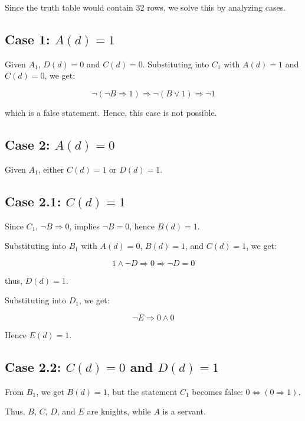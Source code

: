 \documentclass[11pt,paper=b5,footinclude,headinclude]{scrbook} %
\theoremstyle{remark}
\theoremstyle{definition} %
\theoremstyle{theorem} %
\newtheorem{ex}{Exercise\hypertarget{sol:\theex}}[chapter]
\begin{document}
\begin{ex}
\begin{sol}
Since the truth table would contain 32 rows, we solve this by analyzing cases.

\subsection*{Case 1: \( A(d) = 1 \)}

Given \( A_1 \), \( D(d) = 0 \) and \( C(d) = 0 \). Substituting into \( C_1 \) with \( A(d) = 1 \) and \( C(d) = 0 \), we get:

\[
\neg (\neg B \Rightarrow 1) \Rightarrow \neg(B \lor 1) \Rightarrow \neg 1
\]

which is a false statement. Hence, this case is not possible.

\subsection*{Case 2: \( A(d) = 0 \)}

Given \( A_1 \), either \( C(d) = 1 \) or \( D(d) = 1 \).

\subsection*{Case 2.1: \( C(d) = 1 \)}

Since \( C_1 \), \( \neg B \Rightarrow 0 \), implies \( \neg B = 0 \), hence \( B(d) = 1 \).

Substituting into \( B_1 \) with \( A(d) = 0 \), \( B(d) = 1 \), and \( C(d) = 1 \), we get:

\[
1 \land \neg D \Rightarrow 0 \Rightarrow \neg D = 0
\]

thus, \( D(d) = 1 \).

Substituting into \( D_1 \), we get:

\[
\neg E \Rightarrow 0 \land 0
\]

Hence \( E(d) = 1 \).

\subsection*{Case 2.2: \( C(d) = 0 \) and \( D(d) = 1 \)}

From \( B_1 \), we get \( B(d) = 1 \), but the statement \( C_1 \) becomes false: \( 0 \iff (0 \Rightarrow 1) \).

Thus, \( B \), \( C \), \( D \), and \( E \) are knights, while \( A \) is a servant.

\end{sol}


\end{ex}
\end{document}
